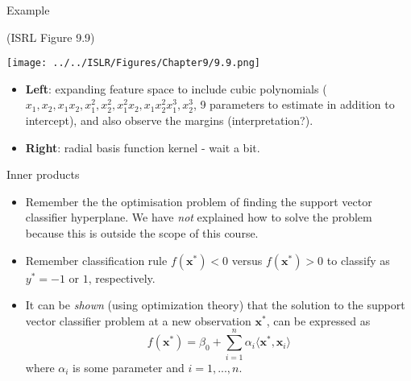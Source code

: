 \documentclass[10pt,ignorenonframetext,]{beamer}
\begin{document}
\begin{frame}

\begin{block}{Example}

(ISRL Figure 9.9)

\centering
\texttt{[image: ../../ISLR/Figures/Chapter9/9.9.png]}

\flushleft

\begin{itemize}
\item
  \textbf{Left}: expanding feature space to include cubic polynomials
  (\(x_1,x_2,x_1x_2,x_1^2,x_2^2,x_1^2x_2,x_1x_2^2x_1^3,x_2^3\), 9
  parameters to estimate in addition to intercept), and also observe the
  margins (interpretation?).
\item
  \textbf{Right}: radial basis function kernel - wait a bit.
\end{itemize}

\end{block}

\end{frame}

\begin{frame}

\begin{block}{Inner products}

\begin{itemize}
\item
  Remember the the optimisation problem of finding the support vector
  classifier hyperplane. We have \emph{not} explained how to solve the
  problem because this is outside the scope of this course.
\item
  Remember classification rule \(f({\boldsymbol x}^*)<0\) versus
  \(f({\boldsymbol x}^*)>0\) to classify as \(y^* = -1\) or \(1\),
  respectively.
\item
  It can be \emph{shown} (using optimization theory) that the solution
  to the support vector classifier problem at a new observation
  \({\boldsymbol x}^*\), can be expressed as \[
  f({\boldsymbol x}^*)=\beta_0 + \sum_{i=1}^n \alpha_i \langle {\boldsymbol x}^*,{\boldsymbol x}_i \rangle
  \] where \(\alpha_i\) is some parameter and \(i=1,...,n\).
\end{itemize}

\end{block}

\end{frame}
\end{document}
